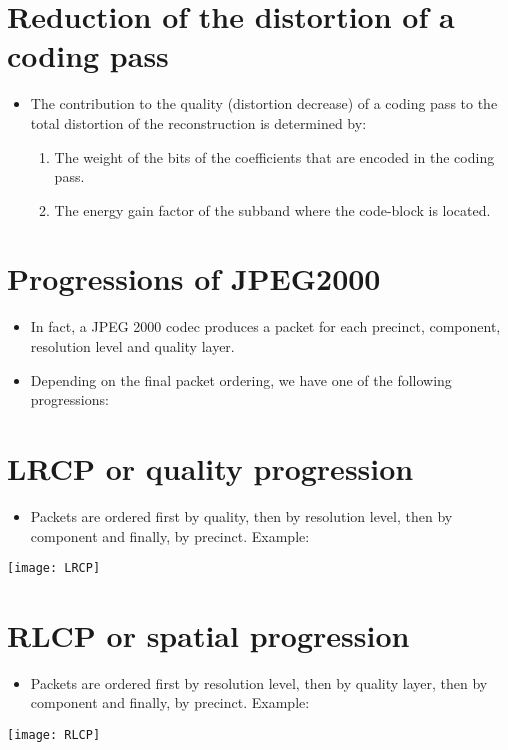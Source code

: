 \section*{Reduction of the distortion of a coding pass}
\begin{itemize}
\item The contribution to the quality (distortion decrease) of a
  coding pass to the total distortion of the reconstruction is
  determined by:
  \begin{enumerate}
  \item The weight of the bits of the coefficients that are encoded in
    the coding pass.
  \item The energy gain factor of the subband where the code-block is
    located.
  \end{enumerate}
\end{itemize}

\section*{Progressions of JPEG2000}
\begin{itemize}
\item In fact, a JPEG 2000 codec produces a packet for each precinct,
  component, resolution level and quality layer.
\item Depending on the final packet ordering, we have one of the
  following progressions:
\end{itemize}

\section*{LRCP or quality progression}
\begin{itemize}
\item Packets are ordered first by quality, then by resolution level,
  then by component and finally, by precinct. Example:
\end{itemize}
\begin{center}
  \texttt{[image: LRCP]}
\end{center}

\section*{RLCP or spatial progression}
\begin{itemize}
\item Packets are ordered first by resolution level, then by quality
  layer, then by component and finally, by precinct. Example:
\end{itemize}
\begin{center}
  \texttt{[image: RLCP]}
\end{center}



